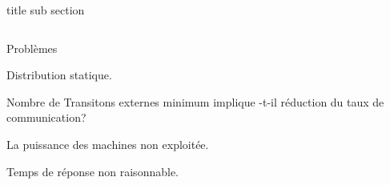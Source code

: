 \begin{frame}{title sub section}
\begin{columns}
	      	\begin{column}{0.7\textwidth}
      			\only<3->
	      		{
	      		\begin{block}{Problèmes}
	      			\begin{itemize}
	      			{	
	      				\item Distribution statique.%
	      			}
      				{
	      				\item Nombre de Transitons externes minimum implique -t-il réduction du taux de communication?%
	      			}
      				{     				
	      				\item La puissance des machines non exploitée.%
	      			}
	      			{
	      				\item Temps de réponse non raisonnable.
	      			}
	      			\end{itemize}
	      		\end{block}
      		  }
	      	\end{column}
      	\end{columns}
     
\end{frame}

